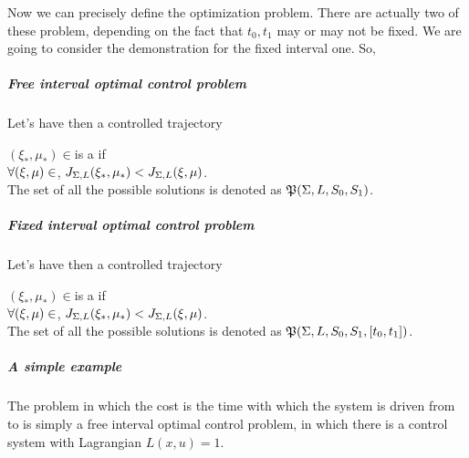 Now we can precisely define the optimization problem. There are actually two of these problem, depending on the fact that $t_0,t_1$ may or may not be fixed. We are going to consider the demonstration for the fixed interval one. So,
\subparagraph{Free interval optimal control problem} Let's have  
	then a controlled trajectory {$(\xi_*,\mu_*)\in$\carcSS is a  if \\$\forall(\xi,\mu)\in$\carcSS,  $J_{\Sigma,L}(\xi_*,\mu_*)<J_{\Sigma,L}(\xi,\mu)$.\\
	The set of all the possible solutions is denoted as $\mathfrak{P}(\Sigma,L,S_0,S_1)$.
\subparagraph{Fixed interval optimal control problem} Let's have  
	then a controlled trajectory {$(\xi_*,\mu_*)\in$\carcSSfix is a  if \\$\forall(\xi,\mu)\in$\carcSSfix,  $ J_{\Sigma,L}(\xi_*,\mu_*)<J_{\Sigma,L}(\xi,\mu)$.\\
	The set of all the possible solutions is denoted as $\mathfrak{P}(\Sigma,L,S_0,S_1,[t_0,t_1])$.
\subparagraph{A simple example} The problem in which the cost is the time with which the system is driven from \sz to \so is simply a free interval optimal control problem, in which there is a control system with Lagrangian $L(x,u)=1$.


}}
